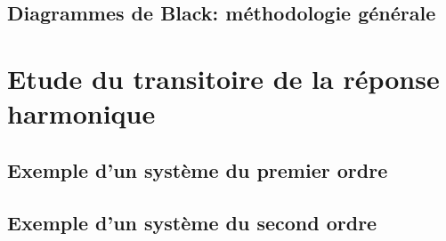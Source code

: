 \subsection{Diagrammes de Black: méthodologie générale}


\section{Etude du transitoire de la réponse harmonique}

\acplhp
\subsection{Exemple d'un système du premier ordre}
\acplhp
\subsection{Exemple d'un système du second ordre}
\acplhp

